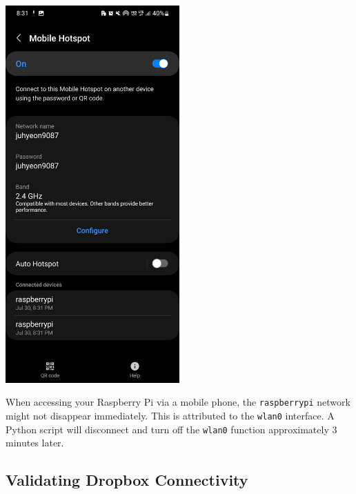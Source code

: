 \documentclass[
  letterpaper,
]{scrbook}
\begin{document}
\includegraphics[width=0.5\textwidth,height=\textheight]{content/material/ch2/check_hotspot.jpg}

\begin{tcolorbox}[enhanced jigsaw, bottomrule=.15mm, opacitybacktitle=0.6, toprule=.15mm, colback=white, colbacktitle=quarto-callout-note-color!10!white, left=2mm, colframe=quarto-callout-note-color-frame, coltitle=black, title=\textcolor{quarto-callout-note-color}{\faInfo}\hspace{0.5em}{Note}, opacityback=0, breakable, bottomtitle=1mm, toptitle=1mm, titlerule=0mm, arc=.35mm, leftrule=.75mm, rightrule=.15mm]

When accessing your Raspberry Pi via a mobile phone, the
\texttt{raspberrypi} network might not disappear immediately. This is
attributed to the \texttt{wlan0} interface. A Python script will
disconnect and turn off the \texttt{wlan0} function approximately 3
minutes later.

\end{tcolorbox}

\hypertarget{validating-dropbox-connectivity}{%
\subsection{Validating Dropbox
Connectivity}\label{validating-dropbox-connectivity}}
\end{document}
